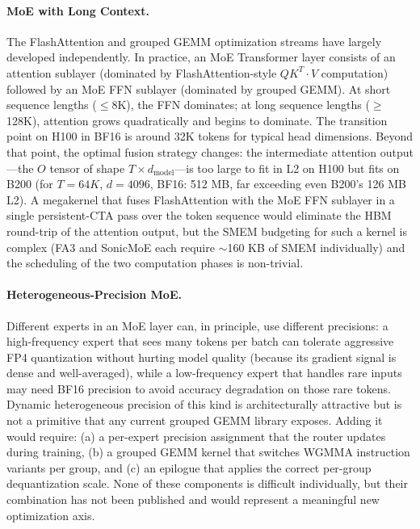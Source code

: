 \documentclass[10pt]{article}
\begin{document}
\paragraph{MoE with Long Context.}
The FlashAttention and grouped GEMM optimization streams have largely developed independently. In practice, an MoE Transformer layer consists of an attention sublayer (dominated by FlashAttention-style $QK^T \cdot V$ computation) followed by an MoE FFN sublayer (dominated by grouped GEMM). At short sequence lengths ($\leq$8K), the FFN dominates; at long sequence lengths ($\geq$128K), attention grows quadratically and begins to dominate. The transition point on H100 in BF16 is around 32K tokens for typical head dimensions. Beyond that point, the optimal fusion strategy changes: the intermediate attention output---the $O$ tensor of shape $T \times d_\text{model}$---is too large to fit in L2 on H100 but fits on B200 (for $T = 64K$, $d = 4096$, BF16: 512 MB, far exceeding even B200's 126 MB L2). A megakernel that fuses FlashAttention with the MoE FFN sublayer in a single persistent-CTA pass over the token sequence would eliminate the HBM round-trip of the attention output, but the SMEM budgeting for such a kernel is complex (FA3 and SonicMoE each require $\sim$160 KB of SMEM individually) and the scheduling of the two computation phases is non-trivial.

\paragraph{Heterogeneous-Precision MoE.}
Different experts in an MoE layer can, in principle, use different precisions: a high-frequency expert that sees many tokens per batch can tolerate aggressive FP4 quantization without hurting model quality (because its gradient signal is dense and well-averaged), while a low-frequency expert that handles rare inputs may need BF16 precision to avoid accuracy degradation on those rare tokens. Dynamic heterogeneous precision of this kind is architecturally attractive but is not a primitive that any current grouped GEMM library exposes. Adding it would require: (a) a per-expert precision assignment that the router updates during training, (b) a grouped GEMM kernel that switches WGMMA instruction variants per group, and (c) an epilogue that applies the correct per-group dequantization scale. None of these components is difficult individually, but their combination has not been published and would represent a meaningful new optimization axis.
\end{document}
